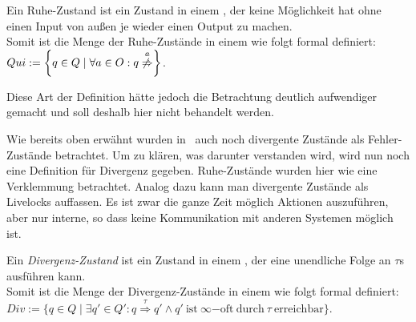 \begin{Def}
  Ein Ruhe-Zustand ist ein Zustand in einem \EIO{}, der keine Möglichkeit hat
  ohne einen Input von außen je wieder einen Output zu machen.\\
  Somit ist die Menge der Ruhe-Zustände in einem \EIO{} wie folgt formal
  definiert: $Qui:=\left\{q\in Q\mid \forall a\in O: q
  \overset{a}{\not{\hspace{-0.1cm}\Rightarrow}}\right\}$.
\end{Def}

Diese Art der Definition hätte jedoch die Betrachtung deutlich aufwendiger
gemacht und soll deshalb hier nicht behandelt werden.

Wie bereits oben erwähnt wurden in~\cite{Chilten2013} auch noch divergente
Zustände als Fehler-Zustände betrachtet. Um zu klären, was darunter verstanden
wird, wird nun noch eine Definition für Divergenz gegeben. Ruhe-Zustände wurden
hier wie eine Verklemmung betrachtet. Analog dazu kann man divergente Zustände
als Livelocks auffassen. Es ist zwar die ganze Zeit möglich Aktionen
auszuführen, aber nur interne, so dass keine Kommunikation mit anderen Systemen
möglich ist.

\begin{Def}[Divergenz]
  Ein \emph{Divergenz-Zustand} ist ein Zustand in einem \EIO{}, der eine
  unendliche Folge an $\tau$s ausführen kann.\\
  Somit ist die Menge der Divergenz-Zustände in einem \EIO{} wie folgt formal
  definiert: $Div := \{q\in Q\mid \exists q'\in Q': q
  \overset{\tau}{\Rightarrow} q' \wedge q'~\mathrm{ist}~\infty\mathrm{-oft}
  ~\mathrm{durch}~\tau ~\mathrm{erreichbar}\}$.
\end{Def}
